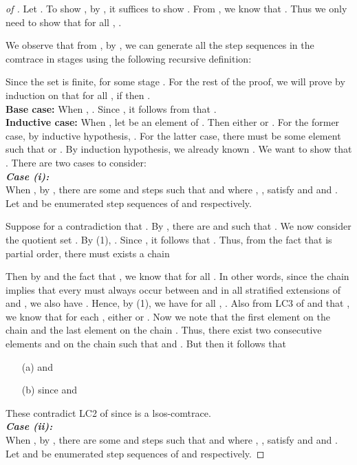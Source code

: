 \documentclass{llncs}
\begin{document}
\begin{proof}[of ] Let . To show , by , it suffices to show . From , we know that . Thus we only need to show that for all , .

We observe that from , by , we can generate all the step sequences in the comtrace  in stages using the following recursive definition:


Since the set  is finite,  for some stage . For the rest of the proof, we will prove by induction on  that for all , if  then . \\
\textbf{Base case:} When , . Since , it follows from  that . \\
\textbf{Inductive case:} When , let  be an element of . Then either  or . For the former case, by inductive hypothesis, . For the latter case, there must be some element  such that  or  . By induction hypothesis, we already known . We want to show that . There are two cases to consider:\smallskip\\
\textit{\textbf{Case (i):}} \\
When , by , there are some  and steps  such that  and  where , ,  satisfy  and  and . Let  and  be enumerated step sequences of  and  respectively. 

Suppose for a contradiction that . By , there are   and  such that . We now consider the quotient set . By   (1), . 
Since , it follows that . Thus, from the fact that  is partial order, there must exists a chain


Then by  and the fact that , we know that  for all . In other words, since the chain  implies that every  must always occur between  and  in all stratified extensions of  and , we also have . Hence, by  (1), we have  for all , . Also from \textsf{LC3} of  and that , we know that for each , either  or . Now we note  that the first element on the chain  and the last element on the chain . Thus, there exist two consecutive elements  and  on the chain such that  and . But then it follows that
\begin{itemize}
 \item[(a)]  and 
 \item[(b)]  since  and 
\end{itemize}
These contradict \textsf{LC2} of  since  is a lsos-comtrace.\smallskip\\
\textit{\textbf{Case (ii):}} \\
When , by , there are some  and steps  such that  and   where , ,  satisfy  and  and . Let  and  be enumerated step sequences of  and  respectively. 


\end{proof}
\end{document}
